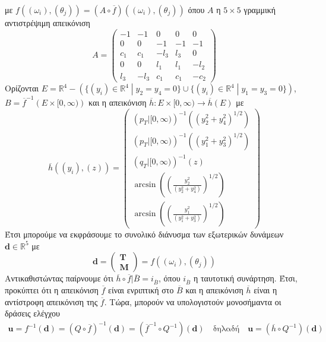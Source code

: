 με  ${f}\left( (\omega_i),(\theta_j) \right)
    = \left(A \circ \overline{f} \right)\left( (\omega_i),(\theta_j) \right)$
όπου $A$ η $5\times5$ γραμμική αντιστρέψιμη απεικόνιση
\begin{equation*}
    A =
    \begin{pmatrix}
        -1  & -1   & 0    & 0   & 0    \\
        0   & 0    & -1   & -1  & -1   \\
        c_1 & c_1  & -l_3 & l_3 & 0    \\
        0   & 0    & l_1  & l_1 & -l_2 \\
        l_3 & -l_3 & c_1  & c_1 & -c_2
    \end{pmatrix}
\end{equation*}
Ορίζονται
$ E = \mathbb{R}^4 - \left( \{(y_i)\in\mathbb{R}^4 \middle| y_2=y_4=0\}
    \cup \{(y_i)\in\mathbb{R}^4 \middle| y_1=y_3=0\}\right)$,
$B = \overline{f}^{-1}\left(E\times[0,\infty)\right)$ και η απεικόνιση 
$\overline{h}:E\times[0,\infty) \rightarrow\overline{h}(E)$ με
\begin{equation*}
    \overline{h}\left((y_i),(z)\right) =
    \begin{pmatrix}
        \left(p_T\big|[0,\infty)\right)^{-1}\left((y_2^2+y_4^2)^{1/2}\right) \\
        \left(p_T\big|[0,\infty)\right)^{-1}\left((y_1^2+y_3^2)^{1/2}\right) \\
        \left(q_T\big|[0,\infty)\right)^{-1}\left(z\right)                  \\
        \arcsin\left(\left(\frac{y_2^2}{(y_2^2+y_4^2)}\right)^{1/2}\right) \\
        \arcsin\left(\left(\frac{y_1^2}{(y_1^2+y_3^2)}\right)^{1/2}\right)
    \end{pmatrix}
\end{equation*}
Έτσι μπορούμε να εκφράσουμε το συνολικό διάνυσμα των εξωτερικών δυνάμεων $\mathbf{d} \in \mathbb{R}^5$ με
\begin{equation*}
    \mathbf{d} = 
    \begin{pmatrix}
        \mathbf{T} \\[6pt]
        \mathbf{M}
    \end{pmatrix}
    = {f}\left( (\omega_i),(\theta_j) \right)
\end{equation*}
Αντικαθιστώντας παίρνουμε ότι $\overline{h}\circ\overline{f}\big|{\overline{B}} = i_{\overline{B}}$, όπου $i_{\overline{B}}$ η ταυτοτική συνάρτηση. Έτσι, προκύπτει ότι η απεικόνιση $\overline{f}$ είναι ενριπτική στο $\overline{B}$ και η απεικόνιση $\overline{h}$ είναι η αντίστροφη απεικόνιση της $\overline{f}$. Τώρα, μπορούν να υπολογιστούν μονοσήμαντα οι δράσεις ελέγχου
\begin{gather*}
    \mathbf{u} = f^{-1}(\mathbf{d}) = (Q \circ \overline{f})^{-1}(\mathbf{d}) = (\overline{f}^{-1} \circ Q^{-1})(\mathbf{d}) \quad \text{δηλαδή} \quad
    \mathbf{u} = (\overline{h} \circ Q^{-1})(\mathbf{d})
\end{gather*}

